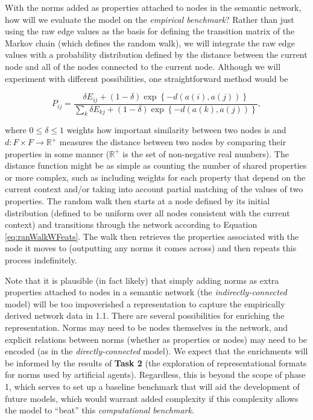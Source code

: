 \documentclass[12pt]{article}
\begin{document}
With the norms added as properties attached to nodes in the semantic
network, how will we evaluate the model on the {\em empirical
  benchmark}? Rather than just using the raw edge values as the basis
for defining the transition matrix of the Markov chain (which defines
the random walk), we will integrate the raw edge values with a
probability distribution defined by the distance between the current
node and all of the nodes connected to the current node. Although we
will experiment with different possibilities, one straightforward
method would be

\begin{equation}
P_{ij} = \frac{\delta E_{ij} + (1-\delta) \exp \left\{ -d(a(i),a(j)) \right\}}{\sum_k{ \delta 
E_{kj} + (1-\delta) \exp \left\{ -d(a(k),a(j)) \right\} }}, \label{eq:ranWalkWFeats}
\end{equation}
\vskip 1mm
 
\noindent where $0 \leq \delta \leq 1$ weights how important
similarity between two nodes is and
$d: F \times F \rightarrow \mathbb{R}^+$ measures the distance between
two nodes by comparing their properties in some manner ($\mathbb{R}^+$
is the set of non-negative real numbers). The distance function might
be as simple as counting the number of shared properties or more
complex, such as including weights for each property that depend on
the current context and/or taking into account partial matching of the
values of two properties. The random walk then starts at a node
defined by its initial distribution (defined to be uniform over all
nodes consistent with the current context) and transitions through the
network according to Equation \ref{eq:ranWalkWFeats}.  The walk then
retrieves the properties associated with the node it moves to
(outputting any norms it comes across) and then repeats this process
indefinitely.

Note that it is plausible (in fact likely) that simply adding norms as
extra properties attached to nodes in a semantic network (the {\em
  indirectly-connected} model) will be too impoverished a
representation to capture the empirically derived network data in
1.1. There are several possibilities for enriching the
representation. Norms may need to be nodes themselves in the network,
and explicit relations between norms (whether as properties or nodes)
may need to be encoded (as in the {\em directly-connected} model). We
expect that the enrichments will be informed by the results of {\bf
  Task 2} (the exploration of representational formats for norms used
by artificial agents). Regardless, this is beyond the scope of phase
1, which serves to set up a baseline benchmark that will aid the
development of future models, which would warrant added complexity if
this complexity allows the model to ``beat'' this {\em computational
  benchmark}.
\end{document}
